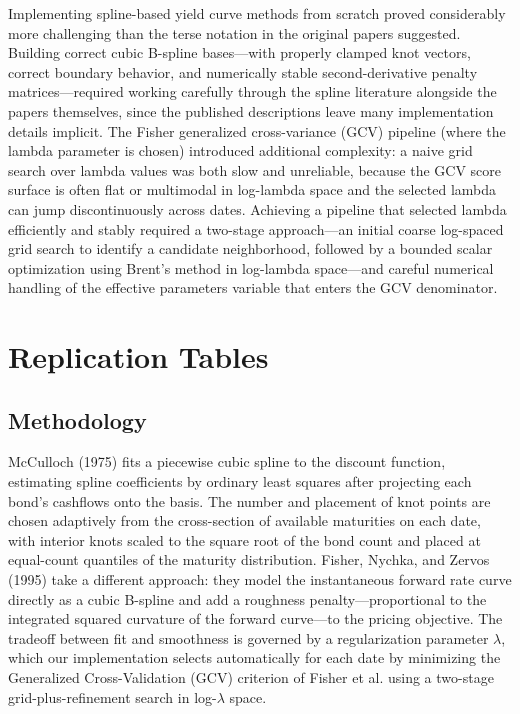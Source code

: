 \documentclass{article}
\begin{document}
Implementing spline-based yield curve methods from scratch proved considerably more challenging than the terse notation in the original papers suggested. Building correct cubic B-spline bases—with properly clamped knot vectors, correct boundary behavior, and numerically stable second-derivative penalty matrices—required working carefully through the spline literature alongside the papers themselves, since the published descriptions leave many implementation details implicit. The Fisher generalized cross-variance (GCV) pipeline (where the lambda parameter is chosen) introduced additional complexity: a naive grid search over lambda values was both slow and unreliable, because the GCV score surface is often flat or multimodal in log-lambda space and the selected lambda can jump discontinuously across dates. Achieving a pipeline that selected lambda efficiently and stably required a two-stage approach—an initial coarse log-spaced grid search to identify a candidate neighborhood, followed by a bounded scalar optimization using Brent's method in log-lambda space—and careful numerical handling of the effective parameters variable that enters the GCV denominator.


\section{Replication Tables}

\subsection{Methodology}

McCulloch (1975) fits a piecewise cubic spline to the discount function, estimating spline coefficients by ordinary least squares after projecting each bond's cashflows onto the basis. The number and placement of knot points are chosen adaptively from the cross-section of available maturities on each date, with interior knots scaled to the square root of the bond count and placed at equal-count quantiles of the maturity distribution. Fisher, Nychka, and Zervos (1995) take a different approach: they model the instantaneous forward rate curve directly as a cubic B-spline and add a roughness penalty—proportional to the integrated squared curvature of the forward curve—to the pricing objective. The tradeoff between fit and smoothness is governed by a regularization parameter $\lambda$, which our implementation selects automatically for each date by minimizing the Generalized Cross-Validation (GCV) criterion of Fisher et al. using a two-stage grid-plus-refinement search in log-$\lambda$ space.
\end{document}
